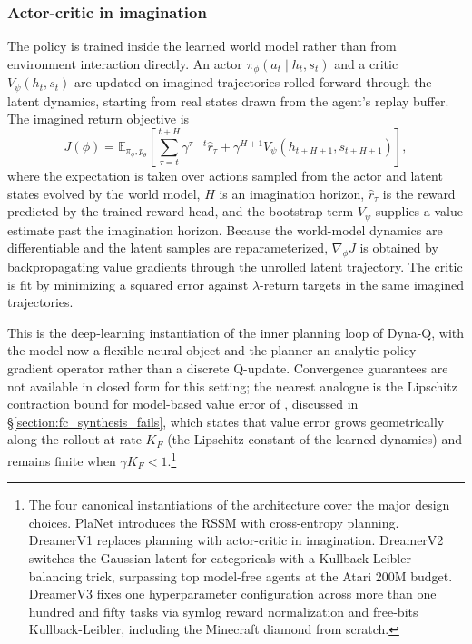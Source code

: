 \subsubsection{Actor-critic in imagination}
\label{section:fc_rssm_imagination}

The policy is trained inside the learned world model rather than from environment interaction directly. An actor $\pi_\phi(a_t \mid h_t, s_t)$ and a critic $V_\psi(h_t, s_t)$ are updated on imagined trajectories rolled forward through the latent dynamics, starting from real states drawn from the agent's replay buffer. The imagined return objective is
\[ J(\phi) = \mathbb{E}_{\pi_\phi, p_\theta}\!\left[ \sum_{\tau = t}^{t+H} \gamma^{\tau - t} \hat r_\tau + \gamma^{H+1} V_\psi(h_{t+H+1}, s_{t+H+1}) \right], \]
where the expectation is taken over actions sampled from the actor and latent states evolved by the world model, $H$ is an imagination horizon, $\hat r_\tau$ is the reward predicted by the trained reward head, and the bootstrap term $V_\psi$ supplies a value estimate past the imagination horizon. Because the world-model dynamics are differentiable and the latent samples are reparameterized, $\nabla_\phi J$ is obtained by backpropagating value gradients through the unrolled latent trajectory. The critic is fit by minimizing a squared error against $\lambda$-return targets in the same imagined trajectories.

This is the deep-learning instantiation of the inner planning loop of Dyna-Q, with the model now a flexible neural object and the planner an analytic policy-gradient operator rather than a discrete Q-update. Convergence guarantees are not available in closed form for this setting; the nearest analogue is the Lipschitz contraction bound for model-based value error of \citet{Asadi2018Lipschitz}, discussed in \S\ref{section:fc_synthesis_fails}, which states that value error grows geometrically along the rollout at rate $K_F$ (the Lipschitz constant of the learned dynamics) and remains finite when $\gamma K_F < 1$.\footnote{The four canonical instantiations of the architecture cover the major design choices. PlaNet \citep{HafnerPlaNet2019} introduces the RSSM with cross-entropy planning. DreamerV1 \citep{HafnerDreamer2020} replaces planning with actor-critic in imagination. DreamerV2 \citep{HafnerDreamerV2_2021} switches the Gaussian latent for categoricals with a Kullback-Leibler balancing trick, surpassing top model-free agents at the Atari 200M budget. DreamerV3 \citep{HafnerDreamerV3_2025} fixes one hyperparameter configuration across more than one hundred and fifty tasks via symlog reward normalization and free-bits Kullback-Leibler, including the Minecraft diamond from scratch.}

